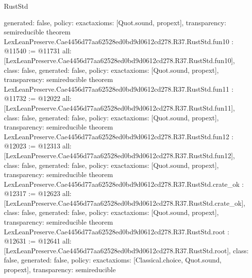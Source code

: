 \begin{lexlean}{RustStd}
\begin{coremodule}
{  generated: false,
  policy: exact{axioms: [Quot.sound, propext]},
  transparency: semireducible
}
theorem LexLeanPreserve.Cae4456d77aa62528ed0bd9d0612cd278.R37.RustStd.fun10 : @11540 := @11731 {
  all: [LexLeanPreserve.Cae4456d77aa62528ed0bd9d0612cd278.R37.RustStd.fun10],
  class: false,
  generated: false,
  policy: exact{axioms: [Quot.sound, propext]},
  transparency: semireducible
}
theorem LexLeanPreserve.Cae4456d77aa62528ed0bd9d0612cd278.R37.RustStd.fun11 : @11732 := @12022 {
  all: [LexLeanPreserve.Cae4456d77aa62528ed0bd9d0612cd278.R37.RustStd.fun11],
  class: false,
  generated: false,
  policy: exact{axioms: [Quot.sound, propext]},
  transparency: semireducible
}
theorem LexLeanPreserve.Cae4456d77aa62528ed0bd9d0612cd278.R37.RustStd.fun12 : @12023 := @12313 {
  all: [LexLeanPreserve.Cae4456d77aa62528ed0bd9d0612cd278.R37.RustStd.fun12],
  class: false,
  generated: false,
  policy: exact{axioms: [Quot.sound, propext]},
  transparency: semireducible
}
theorem LexLeanPreserve.Cae4456d77aa62528ed0bd9d0612cd278.R37.RustStd.crate_ok : @12317 := @12623 {
  all: [LexLeanPreserve.Cae4456d77aa62528ed0bd9d0612cd278.R37.RustStd.crate_ok],
  class: false,
  generated: false,
  policy: exact{axioms: [Quot.sound, propext]},
  transparency: semireducible
}
theorem LexLeanPreserve.Cae4456d77aa62528ed0bd9d0612cd278.R37.RustStd.root : @12631 := @12641 {
  all: [LexLeanPreserve.Cae4456d77aa62528ed0bd9d0612cd278.R37.RustStd.root],
  class: false,
  generated: false,
  policy: exact{axioms: [Classical.choice, Quot.sound, propext]},
  transparency: semireducible
}


\end{coremodule}
\end{lexlean}
